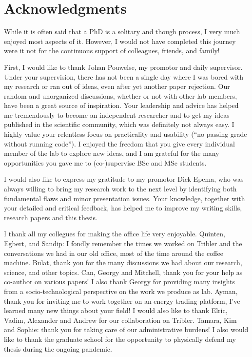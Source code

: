 \chapter*{Acknowledgments}

While it is often said that a PhD is a solitary and though process, I very much enjoyed most aspects of it.
However, I would not have completed this journey were it not for the continuous support of colleagues, friends, and family!

First, I would like to thank Johan Pouwelse, my promotor and daily supervisor.
Under your supervision, there has not been a single day where I was bored with my research or ran out of ideas, even after yet another paper rejection.
Our random and unorganized discussions, whether or not with other lab members, have been a great source of inspiration.
Your leadership and advice has helped me tremendously to become an independent researcher and to get my ideas published in the scientific community, which was definitely not always easy.
I highly value your relentless focus on practicality and usability (\enquote{no passing grade without running code}).
I enjoyed the freedom that you give every individual member of the lab to explore new ideas, and I am grateful for the many opportunities you gave me to (co-)supervise BSc and MSc students.

I would also like to express my gratitude to my promotor Dick Epema, who was always willing to bring my research work to the next level by identifying both fundamental flaws and minor presentation issues.
Your knowledge, together with your detailed and critical feedback, has helped me to improve my writing skills, research papers and this thesis.

I thank all my collegues for making the office life very enjoyable.
Quinten, Egbert, and Sandip: I fondly remember the times we worked on Tribler and the conversations we had in our old office, most of the time around the coffee machine.
Bulat, thank you for the many discussions we had about our research, science, and other topics.
Can, Georgy and Mitchell, thank you for your help as co-author on various papers!
I also thank Georgy for providing many insights from a socio-technological perspective on the work we produce as lab.
Ayman, thank you for inviting me to work together on an energy trading platform, I've learned many new things about your field!
I would also like to thank Elric, Vadim, Alexander and Andrew for our collaboration on Tribler.
Tamara, Kim and Sophie: thank you for taking care of our administrative burdens!
I also would like to thank the graduate school for the opportunity to physically defend my thesis during the ongoing pandemic.

